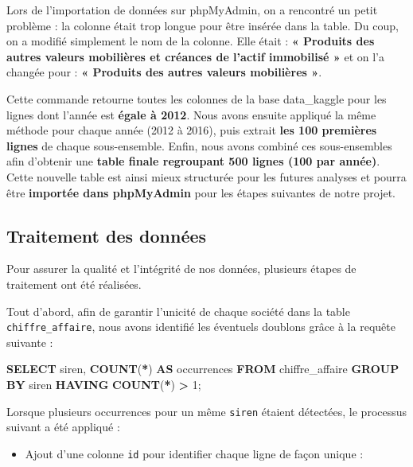 \documentclass[mstat,12pt]{unswthesis}
\newenvironment{Shaded}{\begin{snugshade}}{\end{snugshade}}
\newcommand{\DecValTok}[1]{\textcolor[rgb]{0.00,0.00,0.81}{#1}}
\newcommand{\FunctionTok}[1]{\textcolor[rgb]{0.13,0.29,0.53}{\textbf{#1}}}
\newcommand{\KeywordTok}[1]{\textcolor[rgb]{0.13,0.29,0.53}{\textbf{#1}}}
\newcommand{\NormalTok}[1]{#1}
\newcommand{\OperatorTok}[1]{\textcolor[rgb]{0.81,0.36,0.00}{\textbf{#1}}}
\begin{document}
\medskip

Lors de l'importation de données sur phpMyAdmin, on a rencontré un petit
problème : la colonne était trop longue pour être insérée dans la table.
Du coup, on a modifié simplement le nom de la colonne. Elle était :
\textbf{« Produits des autres valeurs mobilières et créances de l'actif
immobilisé » } et on l'a changée pour : \textbf{« Produits des autres
valeurs mobilières »}.

\medskip

Cette commande retourne toutes les colonnes de la base data\_kaggle pour
les lignes dont l'année est \textbf{égale à 2012}. Nous avons ensuite
appliqué la même méthode pour chaque année (2012 à 2016), puis extrait
\textbf{les 100 premières lignes} de chaque sous-ensemble. Enfin, nous
avons combiné ces sous-ensembles afin d'obtenir une \textbf{table finale
regroupant 500 lignes (100 par année)}. Cette nouvelle table est ainsi
mieux structurée pour les futures analyses et pourra être
\textbf{importée dans phpMyAdmin} pour les étapes suivantes de notre
projet.

\subsection{Traitement des données}\label{traitement-des-donnuxe9es}

Pour assurer la qualité et l'intégrité de nos données, plusieurs étapes
de traitement ont été réalisées.

Tout d'abord, afin de garantir l'unicité de chaque société dans la table
\texttt{chiffre\_affaire}, nous avons identifié les éventuels doublons
grâce à la requête suivante :

\begin{Shaded}
\begin{Highlighting}[]
\KeywordTok{SELECT}\NormalTok{ siren, }\FunctionTok{COUNT}\NormalTok{(}\OperatorTok{*}\NormalTok{) }\KeywordTok{AS}\NormalTok{ occurrences}
\KeywordTok{FROM}\NormalTok{ chiffre\_affaire}
\KeywordTok{GROUP} \KeywordTok{BY}\NormalTok{ siren}
\KeywordTok{HAVING} \FunctionTok{COUNT}\NormalTok{(}\OperatorTok{*}\NormalTok{) }\OperatorTok{\textgreater{}} \DecValTok{1}\NormalTok{;}
\end{Highlighting}
\end{Shaded}

Lorsque plusieurs occurrences pour un même \texttt{siren} étaient
détectées, le processus suivant a été appliqué :

\begin{itemize}
\tightlist
\item
  Ajout d'une colonne \texttt{id} pour identifier chaque ligne de façon
  unique :
\end{itemize}
\end{document}
